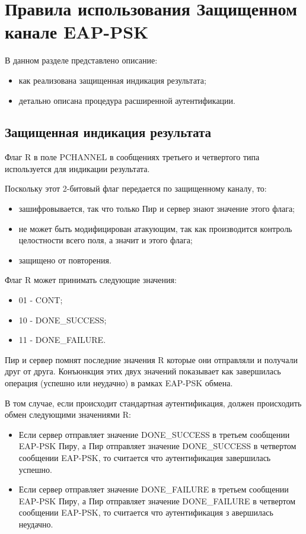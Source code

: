 \newpage
\section{Правила использования Защищенном канале EAP-PSK}

В данном разделе представлено описание:

\begin{itemize}
\item как реализована защищенная индикация результата;
\item детально описана процедура расширенной аутентификации.
\end{itemize}

\subsection{Защищенная индикация результата}

Флаг R в поле PCHANNEL в сообщениях третьего и четвертого типа используется для индикации результата.

Поскольку этот 2-битовый флаг передается по защищенному каналу, то:

\begin{itemize}
\item зашифровывается, так что только Пир и сервер знают значение этого флага;
\item не может быть модифицирован атакующим, так как производится контроль целостности всего поля, а значит и этого флага;
\item защищено от повторения.
\end{itemize}

Флаг R может принимать следующие значения:
\begin{itemize}
\item 01 - CONT;
\item 10 - DONE\_SUCCESS;
\item 11 - DONE\_FAILURE.
\end{itemize}

Пир и сервер помнят последние значения R которые они отправляли и получали друг от друга. Конъюнкция этих двух значений показывает как завершилась операция (успешно или неудачно) в рамках EAP-PSK обмена.

В том случае, если происходит стандартная аутентификация, должен происходить обмен следующими значениями R:

\begin{itemize}
\item Если сервер отправляет значение DONE\_SUCCESS в третьем сообщении EAP-PSK Пиру, а Пир отправляет значение DONE\_SUCCESS в четвертом сообщении EAP-PSK, то считается что аутентификация завершилась успешно.
\item Если сервер отправляет значение DONE\_FAILURE в третьем сообщении EAP-PSK Пиру, а Пир отправляет значение DONE\_FAILURE в четвертом сообщении EAP-PSK, то считается что аутентификация з
авершилась неудачно.
\end{itemize}

